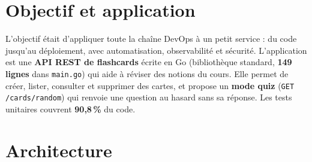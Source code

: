 \documentclass[11pt,a4paper]{article}
\newcommand{\code}[1]{\texttt{\small #1}}
\begin{document}
\section{Objectif et application}
L'objectif était d'appliquer toute la chaîne DevOps à un petit service : du code jusqu'au déploiement, avec
automatisation, observabilité et sécurité. L'application est une \textbf{API REST de flashcards} écrite en Go
(bibliothèque standard, \textbf{149 lignes} dans \code{main.go}) qui aide à réviser des notions du cours.
Elle permet de créer, lister, consulter et supprimer des cartes, et propose un \textbf{mode quiz}
(\code{GET /cards/random}) qui renvoie une question au hasard sans sa réponse. Les tests unitaires couvrent
\textbf{90,8\,\%} du code.

\section{Architecture}
\end{document}
